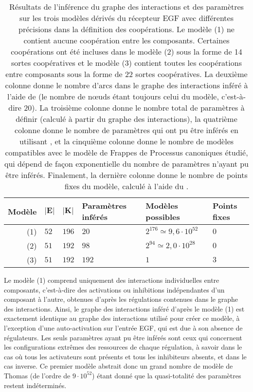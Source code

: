 \begin{table}[ht]
  \ZifferAn
  \begin{center}
  \begin{tabular}{r|l|l|l|l|l} %
    \textbf{Modèle} & $\mathbf{|E|}$ & $\mathbf{|K|}$ & \textbf{Paramètres inférés} &
      \textbf{Modèles possibles} & \textbf{Points fixes}
  \\\hline\hline
    (1) & $52$ & $196$ & $20$ & $2^{176}\simeq 9,6\cdot10^{52}$ & $0$   %
  \\\hline
    (2) & $51$ & $192$ & $98$ & $2^{94}\simeq 2,0\cdot10^{28}$ & $0$    %
  \\\hline
    (3) & $51$ & $192$ & $192$ & $1$ & $3$                              %
  \\\hline
  \end{tabular}
  \end{center}
  \caption{%
    Résultats de l'inférence du graphe des interactions et des paramètres
    sur les trois modèles dérivés du récepteur EGF %
    avec différentes précisions dans la définition des coopérations.
    Le modèle (1) ne contient aucune coopération entre les composants.
    Certaines coopérations ont été incluses dans le modèle (2) sous la forme de 14
    sortes coopératives et le modèle (3) contient toutes les coopérations entre composants
    sous la forme de 22 sortes coopératives.
    La deuxième colonne donne le nombre d'arcs dans le graphe des interactions inféré
    à l'aide de \storef (le nombre de nœuds étant toujours celui du modèle, c'est-à-dire 20).
    La troisième colonne donne le nombre total de paramètres à définir
    (calculé à partir du graphe des interactions),
    la quatrième colonne donne le nombre de paramètres qui ont pu être inférés
    en utilisant \storef,
    et la cinquième colonne donne le nombre de modèles compatibles avec le modèle
    de Frappes de Processus canoniques étudié,
    qui dépend de façon exponentielle du nombre de paramètres n'ayant pu être inférés.
    Finalement, la dernière colonne donne le nombre de points fixes du modèle,
    calculé à l'aide du .
  }
  \ZifferAus
\end{table}


Le modèle (1) comprend uniquement des interactions individuelles entre composants,
c'est-à-dire des activations ou inhibitions indépendantes d'un composant à l'autre,
obtenues d'après les régulations contenues dans le graphe des interactions.
Ainsi, le graphe des interactions inféré d'après le modèle (1) est exactement identique
au graphe des interactions utilisé pour créer ce modèle,
à l'exception d'une auto-activation sur l'entrée EGF,
qui est due à son absence de régulateurs.
Les seuls paramètres ayant pu être inférés sont ceux qui concernent les configurations extrêmes
des ressources de chaque régulation,
à savoir dans le cas où tous les activateurs sont présents et tous les inhibiteurs absents,
et dans le cas inverse.
Ce premier modèle abstrait donc un grand nombre de modèle de Thomas
(de l'ordre de $9\cdot10^{52}$)
étant donné que la quasi-totalité des paramètres restent indéterminés.

